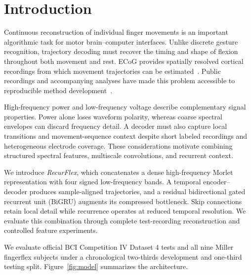 \section{Introduction}
Continuous reconstruction of individual finger movements is an important algorithmic task for motor brain--computer interfaces. Unlike discrete gesture recognition, trajectory decoding must recover the timing and shape of flexion throughout both movement and rest. ECoG provides spatially resolved cortical recordings from which movement trajectories can be estimated~\cite{schalk2007}. Public recordings and accompanying analyses have made this problem accessible to reproducible method development~\cite{miller2019}.

High-frequency power and low-frequency voltage describe complementary signal properties. Power alone loses waveform polarity, whereas coarse spectral envelopes can discard frequency detail. A decoder must also capture local transitions and movement-sequence context despite short labeled recordings and heterogeneous electrode coverage. These considerations motivate combining structured spectral features, multiscale convolutions, and recurrent context.

We introduce \emph{RecurFlex}, which concatenates a dense high-frequency Morlet representation with four signed low-frequency bands. A temporal encoder--decoder produces sample-aligned trajectories, and a residual bidirectional gated recurrent unit (BiGRU) augments its compressed bottleneck. Skip connections retain local detail while recurrence operates at reduced temporal resolution. We evaluate this combination through complete test-recording reconstruction and controlled feature experiments.

We evaluate official BCI Competition IV Dataset 4 tests and all nine Miller fingerflex subjects under a chronological two-thirds development and one-third testing split. Figure~\ref{fig:model} summarizes the architecture.



